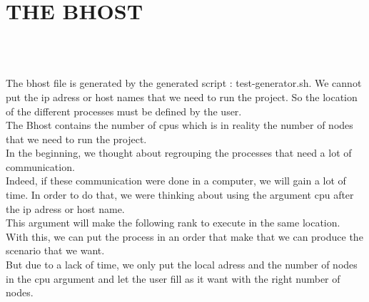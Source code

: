 \documentclass[a4paper,oneside,12pt]{article}
\begin{document}
\section{THE BHOST}
\textbf{\\\\}

   The bhost file is generated by the generated script : test-generator.sh. We cannot put the ip adress or host names  that we need to run the project. So the location of the different processes must be defined by the user.\\

   The Bhost contains the number of cpus which is in reality the number of nodes that we need to run the project. \\

   In the beginning, we thought about regrouping the processes that need a lot of communication. \\
Indeed, if these communication were done in a computer, we will gain a lot of time. In order to do that, we were thinking about using the argument cpu after the ip adress or host name. \\
This argument will make the following rank to execute in the same location. With this, we can put the process in an order that make that we can produce the scenario that we want. \\
But due to a lack of time, we only put the local adress and the number of nodes in the cpu argument and let the user fill as it want with the right number of nodes.

 
\end{document}
